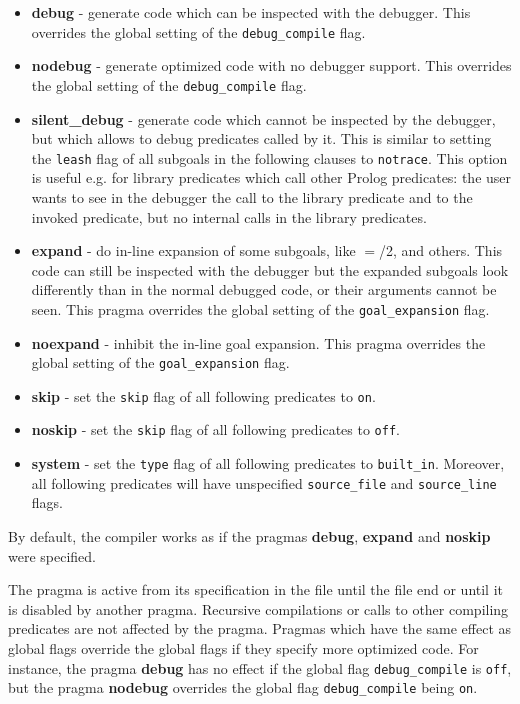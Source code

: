 \begin{itemize}
\item {\bf debug} - generate code which can be inspected with the
debugger.
This overrides the global setting of the {\tt debug_compile} flag.

\item {\bf nodebug} - generate optimized code with no debugger support.
This overrides the global setting of the {\tt debug_compile} flag.

\item {\bf silent_debug} - generate code which cannot be inspected
by the debugger, but which allows to debug predicates called
by it.
This is similar to setting the {\tt leash} flag
of all subgoals in the following clauses
to {\tt notrace}.
This option is useful e.g. for library predicates which call other
Prolog predicates: the user wants to see in the debugger the
call to the library predicate and to the invoked predicate,
but no internal calls in the library predicates.

\item {\bf expand} - do in-line expansion of some subgoals,
like {$=$/2},  and others.
This code can still be inspected with the debugger but the expanded
subgoals look differently than in the normal debugged code,
or their arguments cannot be seen.
This pragma overrides the global setting of the {\tt goal_expansion} flag.

\item {\bf noexpand} - inhibit the in-line goal expansion.
This pragma overrides the global setting of the {\tt goal_expansion} flag.

\item {\bf skip} - set the {\tt skip} flag of all following
predicates to {\tt on}.

\item {\bf noskip} - set the {\tt skip} flag of all following
predicates to {\tt off}.

\item {\bf system} - set the {\tt type} flag of all following
predicates to {\tt built_in}.
Moreover, all following predicates will have unspecified
{\tt source_file} and {\tt source_line} flags.
\end{itemize}
By default, the compiler works as if the pragmas {\bf debug}, {\bf expand}
and {\bf noskip} were specified.

The pragma is active from its specification in the file
until the file end or until it is disabled by another pragma.
Recursive compilations or calls to other compiling predicates
are not affected by the pragma.
Pragmas which have the same effect as global flags override
the global flags if they specify more optimized code.
For instance, the pragma {\bf debug} has no effect if the
global flag {\tt debug_compile} is {\tt off},
but the pragma {\bf nodebug} overrides the global
flag {\tt debug_compile} being {\tt on}.

